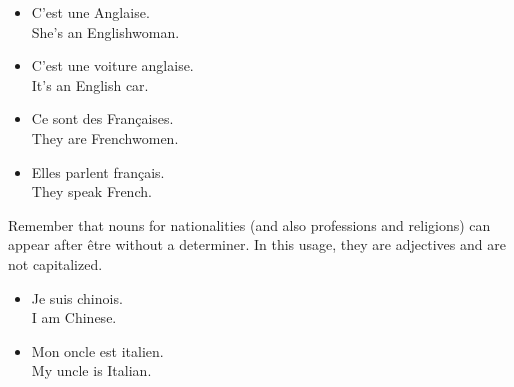 \begin{itemize}
  \item  C'est une Anglaise. \\ She's an Englishwoman.
	\item  C'est une voiture anglaise. \\ It's an English car.
	\item  Ce sont des Fran{\c c}aises. \\ They are Frenchwomen.
	\item  Elles parlent fran{\c c}ais. \\ They speak French.
\end{itemize}

Remember that nouns for nationalities (and also professions and religions) can appear after {\^e}tre without a determiner. In this usage, they are adjectives and are not capitalized.

\begin{itemize}
  \item  Je suis chinois. \\ I am Chinese. 
	\item  Mon oncle est italien. \\ My uncle is Italian.
\end{itemize}

